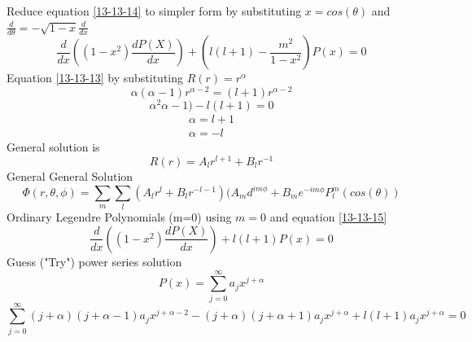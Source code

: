 \documentclass[12pt]{article}
\begin{document}
    Reduce equation \ref{13-13-14} to simpler form by substituting $x=cos(\theta)$ and $\frac{d}{d\theta} = -\sqrt{1-x} \frac{d}{dx}$
    \begin{equation} \label{13-13-15}
        \frac{d}{dx} ((1-x^2) \frac{d P(X)}{dx}) + (l(l+1)-\frac{m^2}{1-x^2}) P(x) = 0
    \end{equation}
    Equation \ref{13-13-13} by substituting $R(r) = r^{\alpha}$
    \begin{equation} \label{13-13-16}
        \alpha (\alpha - 1) r^{\alpha - 2} = (l+1) r^{\alpha - 2}
    \end{equation}    
    \begin{equation} \label{13-13-17}
        \alpha^2 \alpha - 1) - l(l+1) = 0
    \end{equation}        
    \begin{gather*}
        \alpha = l + 1
        \\ \alpha = -l
    \end{gather*}
    General solution is 
    \begin{equation} \label{13-13-18}
        R(r) = A_l r^{l+1} + B_l r^{-1}
    \end{equation} 
    General General Solution 
    \begin{equation} \label{13-13-19}
        \Phi(r,\theta, \phi) = \sum_m \sum_l (A_l r^l + B_l r^{-l-1}) (A_m d^{im \phi} + B_m e^{-im \phi} P_l^m(cos(\theta))
    \end{equation}     
    \newline Ordinary Legendre Polynomials (m=0)
    \newline using $m=0$ and equation \ref{13-13-15}
    \begin{equation} \label{13-13-20}
        \frac{d}{dx} ((1-x^2) \frac{d P(X)}{dx}) + l(l+1) P(x) = 0
    \end{equation}
    Guess ("Try") power series solution 
    \begin{equation} \label{13-13-21}
        P(x) = \sum_{j=0}^{\infty} a_j x^{j+\alpha}
    \end{equation}    
    \begin{equation} \label{13-13-22}
        \sum_{j=0}^{\infty} (j+\alpha) (j + \alpha - 1) a_j x^{j+\alpha-2} - (j+\alpha) (j + \alpha + 1) a_j x^{j+\alpha} + l(l+1) a_j x^{j+\alpha} = 0
    \end{equation}        
\end{document}
